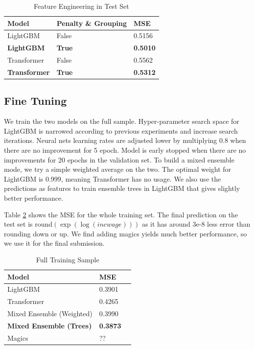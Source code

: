 \documentclass[11pt, letter,twocolumn]{article}
\begin{document}
 \begin{table}[ht]
	\caption{Feature Engineering in Test Set}
	\label{tab:my-table_penalty} 
	\centering \vspace{1em}
	\begin{tabular}{lll}
		\hline
		Model   & Penalty \&  Grouping & MSE    \\
		\hline
		LightGBM & False  & 0.5156 \\
		\textbf{LightGBM}  & \textbf{True}  & \textbf{0.5010}\\
		Transformer  & False & 0.5562\\
		\textbf{Transformer}  & \textbf{True} & \textbf{0.5312} \\
		\hline
	\end{tabular}
\end{table}
\subsection{Fine Tuning}

We train the two models on the full sample. Hyper-parameter search space for LightGBM is narrowed according to previous experiments and increase search iterations. Neural nets learning rates are adjusted lower by multiplying 0.8 when there are no improvement for 5 epoch. Model is early stopped when there are no improvements for 20 epochs in the validation set.   To build a mixed ensemble mode, we try a simple weighted average on the two. The optimal weight for LightGBM is 0.999, meaning Transformer has no usage. We also use the predictions as  features to train  ensemble trees in LightGBM that gives slightly better performance. 

 
Table \ref{tab:my-table_penalty_full_sample}   shows the MSE for the whole training set. The final prediction on the test set is  round$(\exp(\log(incwage)))$ as it has around 3e-8 less error than rounding down or up. We find adding magics yields much better performance, so we use it for the final submission.
 
\begin{table}[ht]
 	\caption{Full Training Sample}
 	\label{tab:my-table_penalty_full_sample} 
 	\centering \vspace{1em}
 	\begin{tabular}{lll}
 		\hline
 		Model   &    MSE    \\
 		\hline
 		LightGBM    & 0.3901 \\
 		Transformer     & 0.4265\\
 	    Mixed Ensemble (Weighted)    & 0.3990\\
 		\textbf{Mixed Ensemble (Trees)  }   & \textbf{0.3873}\\
 		Magics &  ?? \\
 		\hline
 	\end{tabular}
 \end{table}
\end{document}
